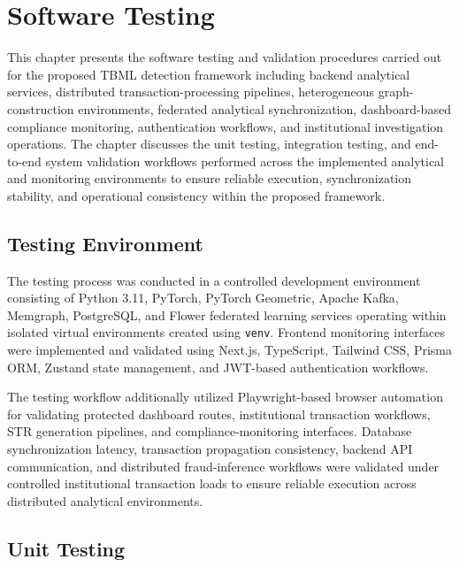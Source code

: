 \chapter[Software Testing]{\textbf{Software Testing}}

This chapter presents the software testing and validation procedures carried out for the proposed TBML detection framework including backend analytical services, distributed transaction-processing pipelines, heterogeneous graph-construction environments, federated analytical synchronization, dashboard-based compliance monitoring, authentication workflows, and institutional investigation operations. The chapter discusses the unit testing, integration testing, and end-to-end system validation workflows performed across the implemented analytical and monitoring environments to ensure reliable execution, synchronization stability, and operational consistency within the proposed framework.

\section[Testing Environment]{\textbf{Testing Environment}}

The testing process was conducted in a controlled development environment consisting of Python 3.11, PyTorch, PyTorch Geometric, Apache Kafka, Memgraph, PostgreSQL, and Flower federated learning services operating within isolated virtual environments created using \texttt{venv}. Frontend monitoring interfaces were implemented and validated using Next.js, TypeScript, Tailwind CSS, Prisma ORM, Zustand state management, and JWT-based authentication workflows.

The testing workflow additionally utilized Playwright-based browser automation for validating protected dashboard routes, institutional transaction workflows, STR generation pipelines, and compliance-monitoring interfaces. Database synchronization latency, transaction propagation consistency, backend API communication, and distributed fraud-inference workflows were validated under controlled institutional transaction loads to ensure reliable execution across distributed analytical environments.

\section[Unit Testing]{\textbf{Unit Testing}}

